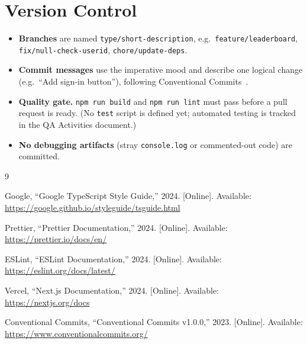 \documentclass[11pt]{article}
\begin{document}
\section{Version Control}

\begin{itemize}
    \item \textbf{Branches} are named \texttt{type/short-description}, e.g.\
    \texttt{feature/leaderboard}, \texttt{fix/null-check-userid},
    \texttt{chore/update-deps}.
    \item \textbf{Commit messages} use the imperative mood and describe one
    logical change (e.g.\ ``Add sign-in button''), following Conventional
    Commits~\cite{cc}.
    \item \textbf{Quality gate.} \texttt{npm run build} and
    \texttt{npm run lint} must pass before a pull request is ready. (No
    \texttt{test} script is defined yet; automated testing is tracked in the
    QA Activities document.)
    \item \textbf{No debugging artifacts} (stray \texttt{console.log} or
    commented-out code) are committed.
\end{itemize}

\begin{thebibliography}{9}

Google, ``Google TypeScript Style Guide,'' 2024. [Online]. Available:
\url{https://google.github.io/styleguide/tsguide.html}

Prettier, ``Prettier Documentation,'' 2024. [Online]. Available:
\url{https://prettier.io/docs/en/}

ESLint, ``ESLint Documentation,'' 2024. [Online]. Available:
\url{https://eslint.org/docs/latest/}

Vercel, ``Next.js Documentation,'' 2024. [Online]. Available:
\url{https://nextjs.org/docs}

Conventional Commits, ``Conventional Commits v1.0.0,'' 2023. [Online].
Available: \url{https://www.conventionalcommits.org/}

\end{thebibliography}
\end{document}
